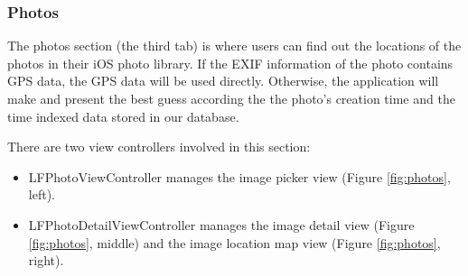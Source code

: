 \documentclass[12pt,a4paper]{article}
\renewcommand\texttt[1]{{\ttfamily\color{textttColor}#1}}
\begin{document}
            
            \subsubsection{Photos} %
            \label{fe:photos}
            
            The photos section (the third tab) is where users can find out the locations of the photos in their iOS photo library. If the EXIF information of the photo contains GPS data, the GPS data will be used directly. Otherwise, the application will make and present the best guess according the the photo's creation time and the time indexed data stored in our database. 
            
            There are two view controllers involved in this section:
            
            \begin{itemize}
                \setlength\itemsep{-0.5em}
                \item \texttt{LFPhotoViewController} manages the image picker view (Figure \ref{fig:photos}, left).
                \item \texttt{LFPhotoDetailViewController} manages the image detail view (Figure \ref{fig:photos}, middle) and the image location map view (Figure \ref{fig:photos}, right).
            \end{itemize}
            
\end{document}
